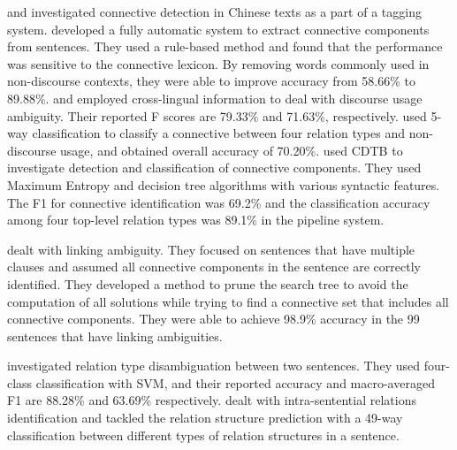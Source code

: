 \cite{t1999applying,t2000enhancement} and \cite{chan2000mining} investigated
connective detection in Chinese texts as a part of a tagging system. \cite{hu2009research}
developed a fully automatic system to extract connective components from sentences.
They used a rule-based method and found that the performance was sensitive to
the connective lexicon. By removing words commonly used in non-discourse contexts,
they were able to improve accuracy from 58.66\% to 89.88\%.
\cite{zhou2012cross} and \cite{li2014cross} employed
cross-lingual information to deal with discourse usage ambiguity.
Their reported F scores are 79.33\% and 71.63\%, respectively.
\cite{li2014cross} used 5-way classification to classify a connective
between four relation types and non-discourse usage,
and obtained overall accuracy of 70.20\%. \cite{li2015automatic} used CDTB to
investigate detection and classification of connective components. They used
Maximum Entropy and decision tree algorithms with various syntactic features.
The F1 for connective identification was 69.2\% and the classification
accuracy among four top-level relation types was 89.1\% in the pipeline system.

\cite{hu2011research} dealt with linking ambiguity. They focused on sentences
that have multiple clauses and assumed all connective components in the sentence
are correctly identified. They developed a method to prune the search tree
to avoid the computation of all solutions while trying to find a connective
set that includes all connective components. They were able to achieve 98.9\%
accuracy in the 99 sentences that have linking ambiguities.

\cite{huang2011chinese} investigated relation type disambiguation between
two sentences. They used four-class classification with SVM, and their reported
accuracy and macro-averaged F1 are 88.28\% and 63.69\% respectively.
\cite{huang2012contingency} dealt with intra-sentential relations identification
and tackled the relation structure prediction with a 49-way classification
between different types of relation structures in a sentence.
